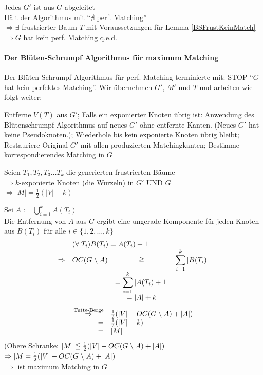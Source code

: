 Jedes $G'$ ist aus $G$ abgeleitet\\
Hält der Algorithmus mit "`$\nexists$ perf. Matching"'\\
$\Rightarrow \exists$ frustrierter Baum $T$ mit Voraussetzungen für Lemma  
\ref{BSFrustKeinMatch}\\
$\Rightarrow G$ hat kein perf. Matching q.e.d.

\paragraph{Der Blüten-Schrumpf Algorithmus für maximum Matching}

Der Blüten-Schrumpf Algorithmus für perf. Matching terminierte mit: STOP
"`$G$ hat kein perfektes Matching"'. Wir übernehmen $G'$, $M'$ und $T$ und
arbeiten wie folgt weiter:
\begin{algorithmic}
\STATE Entferne $V(T)$ aus $G'$;
\STATE Falls ein exponierter Knoten übrig ist: Anwendung des Blütenschrumpf
Algorithmus auf neues $G'$ ohne entfernte Kanten. (Neues $G'$ hat keine
Pseudoknoten.);
\STATE Wiederhole bis kein exponierte Knoten übrig bleibt;
\STATE Restauriere Original $G'$ mit allen produzierten Matchingkanten;
\STATE Bestimme korrespondierendes Matching in $G$
\end{algorithmic}

Seien $T_1, T_2, T_3 \ldots T_k$ die generierten frustrierten Bäume\\
$\Rightarrow k$-exponierte Knoten (die Wurzeln) in $G'$ UND $G$\\
$\Rightarrow |M| = \frac{1}{2}(|V|-k)$

Sei $A := \displaystyle \bigcup_{i=1}^k A(T_i)$\\
Die Entfernung von $A$ aus $G$ ergibt eine ungerade Komponente für jeden
Knoten aus $B(T_i)$ für alle $i \in \{1,2,\ldots,k\}$
\[\begin{array}{crcl}
&\multicolumn{3}{l}{(\forall \; T_i) B(T_i)= A(T_i)+1} \\
\Rightarrow & OC(G\wout A)&\geqq& \displaystyle \sum_{i=1}^k |B(T_i)|\\
&&=\displaystyle \sum_{i=1}^k |A(T_i) + 1|\\
&&=|A| +k\\
\end{array}\]
\[\begin{array}{rl}
\stackrel{\mbox{\scriptsize Tutte-Berge}}{\Rightarrow} & \frac{1}{2}(|V| -
OC(G\;\backslash\; A) + |A|)\\
=& \frac{1}{2}(|V| - k)\\
=& |M|
\end{array}\]
(Obere Schranke: $|M|\leqq \frac{1}{2}(|V| -
OC(G\;\backslash\; A) + |A|)$\\
$\Rightarrow | M = \frac{1}{2} (|V| - OC(G\;\backslash\; A) + |A|)$\\
$\Rightarrow$ ist maximum Matching in $G$

